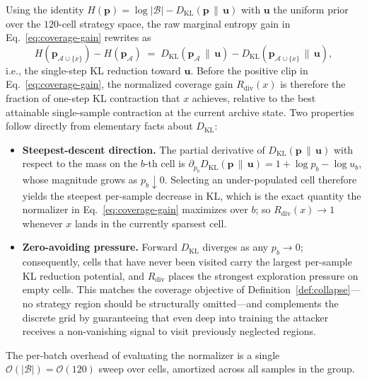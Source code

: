 \documentclass{article}
\newcommand{\KL}{D_{\mathrm{KL}}}
\newcommand{\archive}{\mathcal{A}}
\newcommand{\strategyspace}{\mathcal{B}}
\newcommand{\uniform}{\mathbf{u}}
\newcommand{\archivedist}{\mathbf{p}_{\archive}}
\begin{document}
Using the identity $H(\mathbf{p}) = \log|\strategyspace| - \KL(\mathbf{p}\,\|\,\uniform)$ with $\uniform$ the uniform prior over the $120$-cell strategy space, the raw marginal entropy gain in Eq.~\ref{eq:coverage-gain} rewrites as
\begin{equation}
  H(\mathbf{p}_{\archive\cup\{x\}}) - H(\archivedist)
  \;=\; \KL(\archivedist\,\|\,\uniform) - \KL(\mathbf{p}_{\archive\cup\{x\}}\,\|\,\uniform),
  \label{eq:kl-identity}
\end{equation}
i.e., the single-step KL reduction toward $\uniform$. Before the positive clip in Eq.~\ref{eq:coverage-gain}, the normalized coverage gain $R_{\mathrm{div}}(x)$ is therefore the fraction of one-step KL contraction that $x$ achieves, relative to the best attainable single-sample contraction at the current archive state. Two properties follow directly from elementary facts about $\KL$:
\begin{itemize}[leftmargin=*, topsep=2pt, itemsep=2pt]
  \item \textbf{Steepest-descent direction.} The partial derivative of $\KL(\mathbf{p}\,\|\,\uniform)$ with respect to the mass on the $b$-th cell is $\partial_{p_b}\KL(\mathbf{p}\,\|\,\uniform) = 1 + \log p_b - \log u_b$, whose magnitude grows as $p_b \downarrow 0$. Selecting an under-populated cell therefore yields the steepest per-sample decrease in KL, which is the exact quantity the normalizer in Eq.~\ref{eq:coverage-gain} maximizes over $b$; so $R_{\mathrm{div}}(x) \to 1$ whenever $x$ lands in the currently sparsest cell.
  \item \textbf{Zero-avoiding pressure.} Forward $\KL$ diverges as any $p_b \to 0$; consequently, cells that have never been visited carry the largest per-sample KL reduction potential, and $R_{\mathrm{div}}$ places the strongest exploration pressure on empty cells. This matches the coverage objective of Definition~\ref{def:collapse}---no strategy region should be structurally omitted---and complements the discrete grid by guaranteeing that even deep into training the attacker receives a non-vanishing signal to visit previously neglected regions.
\end{itemize}
The per-batch overhead of evaluating the normalizer is a single $\mathcal{O}(|\strategyspace|)=\mathcal{O}(120)$ sweep over cells, amortized across all samples in the group.
\end{document}
